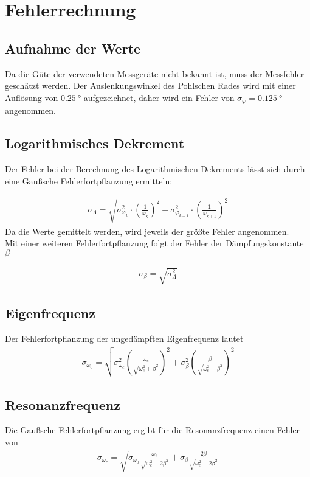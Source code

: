 \section{Fehlerrechnung}
\subsection{Aufnahme der Werte}
Da die Güte der verwendeten Messgeräte nicht bekannt ist, muss der Messfehler geschätzt werden. Der Auslenkungswinkel des Pohlschen Rades wird mit einer Auflösung von $\SI{0,25}{\degree}$ aufgezeichnet, daher wird ein Fehler von $\sigma_\varphi=\SI{0,125}{\degree}$ angenommen.

\subsection{Logarithmisches Dekrement}
Der Fehler bei der Berechnung des Logarithmischen Dekrements lässt sich durch eine Gaußsche Fehlerfortpflanzung ermitteln:

\begin{align}
\sigma_\Lambda=\sqrt{\sigma_{\varphi_k}^2\cdot\left( \frac{1}{\varphi_k}\right)^2+\sigma_{\varphi_{k+1}}^2\cdot\left( \frac{1}{\varphi_{k+1}}\right) ^2}
\end{align}
Da die Werte gemittelt werden, wird jeweils der größte Fehler angenommen.
\ \\
Mit einer weiteren Fehlerfortpflanzung folgt der Fehler der Dämpfungskonstante $\beta$

\begin{align}
\sigma_\beta=\sqrt{\sigma_\Lambda^2}
\end{align}

\subsection{Eigenfrequenz}
Der Fehlerfortpflanzung der ungedämpften Eigenfrequenz lautet
\begin{align}
\sigma_{\omega_0} = \sqrt{\sigma_{\omega_e}^{2}\left(\frac{\omega_e}{\sqrt{\omega_e^{2}+\beta^{2}}}\right)^{2}+\sigma_\beta^{2}\left(\frac{\beta}{\sqrt{\omega_e^{2}+\beta^{2}}}\right)^{2}}
\end{align}

\subsection{Resonanzfrequenz}
Die Gaußsche Fehlerfortpflanzung ergibt für die Resonanzfrequenz einen Fehler von
\begin{align}
\sigma_{\omega_r}=\sqrt{\sigma_{\omega_0}\frac{\omega_e}{\sqrt{\omega_e^{2}-2\beta^{2}}}+\sigma_\beta\frac{2\beta}{\sqrt{\omega_e^{2}-2\beta^{2}}}}
\end{align}

